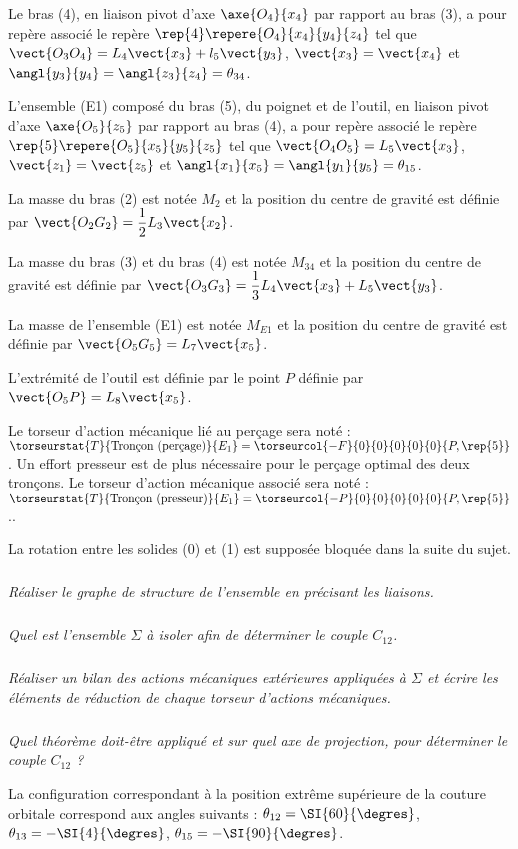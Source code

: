 Le bras (4), en liaison pivot d'axe $\axe{O_4}{x_4}$ par rapport au bras (3), a pour repère
associé le repère $\rep{4}\repere{O_4}{x_4}{y_4}{z_4}$ tel que $\vect{O_3 O_4} = L_4\vect{x_3} +l_5 \vect{y_3}$, $\vect{x_3}=\vect{x_4}$ et $\angl{y_3}{y_4}=\angl{z_3}{z_4}=\theta_{34}$.

L'ensemble (E1) composé du bras (5), du poignet et de l'outil, en liaison pivot d'axe $\axe{O_5}{z_5}$ par
rapport au bras (4), a pour repère associé le repère $\rep{5}\repere{O_5}{x_5}{y_5}{z_5}$ tel que $\vect{O_4O_5}=L_5\vect{x_3}$, $\vect{z_1}=\vect{z_5}$ et $\angl{x_1}{x_5}=\angl{y_1}{y_5}=\theta_{15}$.


La masse du bras (2) est notée $M_2$ et la position du centre de gravité est définie par $\vect{O_2G_2}=\dfrac{1}{2}L_3\vect{x_2}$.


La masse du bras (3) et du bras (4) est notée $M_{34}$ et la position du centre de gravité est définie par
$\vect{O_3G_3}=\dfrac{1}{3}L_4\vect{x_3}+L_5\vect{y_3}$.

La masse de l'ensemble (E1) est notée $M_{E1}$ et la position du centre de gravité est définie par
$\vect{O_5G_5}=L_7\vect{x_5}$. 

L’extrémité de l’outil est définie par le point $P$ définie par $\vect{O_5P}=L_8\vect{x_5}$. 

Le torseur d’action mécanique lié au perçage sera noté : $\torseurstat{T}{\text{Tronçon (perçage)}}{E_1}=\torseurcol{-F}{0}{0}{0}{0}{0}{P, \rep{5}}$.
Un effort presseur est de plus nécessaire pour le perçage optimal des deux tronçons. Le torseur
d’action mécanique associé sera noté :$\torseurstat{T}{\text{Tronçon (presseur)}}{E_1}=\torseurcol{-P}{0}{0}{0}{0}{0}{P, \rep{5}}$..

La rotation entre les solides (0) et (1) est supposée bloquée dans la suite du sujet.

\subparagraph{}\textit{Réaliser le graphe de structure de l'ensemble en précisant les liaisons.}

\subparagraph{}\textit{Quel est l'ensemble $\Sigma$ à isoler afin de déterminer le couple $C_{12}$.}

\subparagraph{}\textit{Réaliser un bilan des actions mécaniques extérieures appliquées à $\Sigma$ et écrire les éléments de réduction de chaque torseur d'actions mécaniques.}

\subparagraph{}\textit{Quel théorème doit-être appliqué et sur quel axe de projection, pour déterminer le couple $C_{12}$ ?}

La configuration correspondant à la position extrême supérieure de la couture orbitale correspond aux angles suivants : $\theta_{12}=\SI{60}{\degres}$, $\theta_{13}=-\SI{4}{\degres}$, $\theta_{15}=-\SI{90}{\degres}$.

